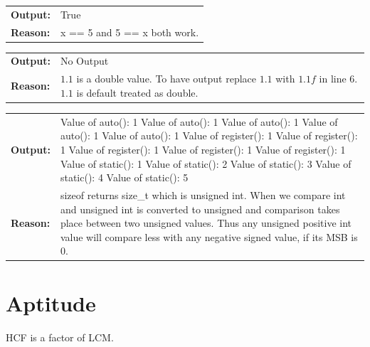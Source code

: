 \documentclass[a4paper,oneside]{book}
\begin{document}
\begin{mdframed}[style=MyFrame]
\begin{tabular}[H]{p{1.5cm}p{15cm}}
\textbf{Output:} & True \\
\textbf{Reason:} & x == 5 and 5 == x both work.\\
\end{tabular}
\end{mdframed}
\begin{mdframed}[style=MyFrame]
\begin{tabular}[H]{p{1.5cm}p{15cm}}
\textbf{Output:} & No Output \\
\textbf{Reason:} & $1.1$ is a double value. To have output replace $1.1$ with $1.1f$ in line $6$. $1.1$ is default treated as double.\\
\end{tabular}
\end{mdframed}
\begin{mdframed}[style=MyFrame]
\begin{tabular}[H]{p{1.5cm}p{15cm}}
\textbf{Output:} & Value of auto(): 1
Value of auto(): 1
Value of auto(): 1
Value of auto(): 1
Value of auto(): 1
Value of register(): 1
Value of register(): 1
Value of register(): 1
Value of register(): 1
Value of register(): 1
Value of static(): 1
Value of static(): 2
Value of static(): 3
Value of static(): 4
Value of static(): 5
 \\ 
\textbf{Reason:} & sizeof returns size\_t which is unsigned int. When we compare int and unsigned int is converted to unsigned and comparison takes place between two unsigned values. Thus any unsigned positive int value will compare less with any negative signed value, if its MSB is 0. \\ 
\end{tabular}
\end{mdframed}

\restoregeometry





\part{Aptitude}
HCF is a factor of LCM.








 \printindex
\end{document}
